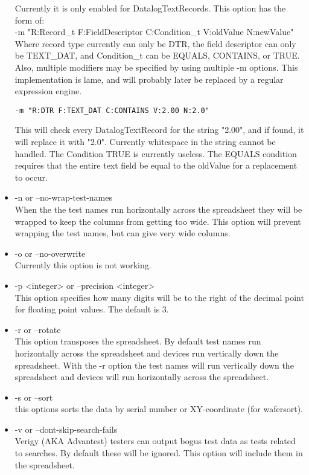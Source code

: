 \documentclass[letterpaper]{article}
\begin{document}
\begin{itemize}
Currently it is only enabled for DatalogTextRecords. This option has the form of:\\
-m "R:Record\_t F:FieldDescriptor C:Condition\_t V:oldValue N:newValue"\\
Where record type currently can only be DTR, the field descriptor can only be TEXT\_DAT, and
Condition\_t can be EQUALS, CONTAINS, or TRUE.  Also, multiple modifiers may be specified by using multiple -m options.
This implementation is lame, and will probably later be replaced by a regular expression engine.\\
\begin{verbatim}
-m "R:DTR F:TEXT_DAT C:CONTAINS V:2.00 N:2.0"
\end{verbatim}
This will check every DatalogTextRecord for the string "2.00", and
if found, it will replace it with "2.0".  Currently whitespace in the
string cannot be handled.  The Condition TRUE is currently useless. The EQUALS
condition requires that the entire text field be equal to the oldValue for
a replacement to occur.
\item -n or --no-wrap-test-names\\
When the the test names run horizontally across the spreadsheet they will be wrapped
to keep the columns from getting too wide.  This option will prevent wrapping the test
names, but can give very wide columns.
\item -o or --no-overwrite\\
Currently this option is not working.
\item -p <integer> or --precision <integer>\\
This option specifies how many digits will be to the right of the decimal
point for floating point values.  The default is 3.
\item -r or --rotate\\
This option transposes the spreadsheet.  By default test names run horizontally across
the spreadsheet and devices run vertically down the spreadsheet. With the -r option
the test names will run vertically down the spreadsheet and devices will run horizontally
across the spreadsheet.
\item -s or --sort\\
this options sorts the data by serial number or XY-coordinate (for wafersort).
\item -v or --dont-skip-search-fails\\
Verigy (AKA Advantest) testers can output bogus test data as tests related to searches.  By default
these will be ignored.  This option will include them in the spreadsheet.

\end{itemize}
\end{document}
